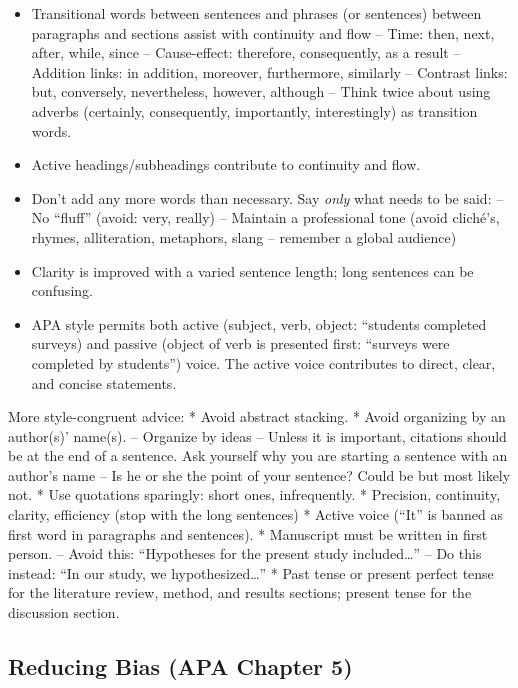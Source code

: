 \documentclass[
  english,
]{book}
\providecommand{\tightlist}{%
  \setlength{\itemsep}{0pt}\setlength{\parskip}{0pt}}
\begin{document}
\begin{itemize}
\tightlist
\item
  Transitional words between sentences and phrases (or sentences) between paragraphs and sections assist with continuity and flow
  -- Time: then, next, after, while, since
  -- Cause-effect: therefore, consequently, as a result
  -- Addition links: in addition, moreover, furthermore, similarly
  -- Contrast links: but, conversely, nevertheless, however, although
  -- Think twice about using adverbs (certainly, consequently, importantly, interestingly) as transition words.
\item
  Active headings/subheadings contribute to continuity and flow.
\item
  Don't add any more words than necessary. Say \emph{only} what needs to be said:
  -- No ``fluff'' (avoid: very, really)
  -- Maintain a professional tone (avoid cliché's, rhymes, alliteration, metaphors, slang -- remember a global audience)
\item
  Clarity is improved with a varied sentence length; long sentences can be confusing.
\item
  APA style permits both active (subject, verb, object: ``students completed surveys) and passive (object of verb is presented first: ``surveys were completed by students'') voice. The active voice contributes to direct, clear, and concise statements.
\end{itemize}

More style-congruent advice:
* Avoid abstract stacking.
* Avoid organizing by an author(s)' name(s).
-- Organize by ideas -- Unless it is important, citations should be at the end of a sentence. Ask yourself why you are starting a sentence with an author's name -- Is he or she the point of your sentence? Could be but most likely not.
* Use quotations sparingly: short ones, infrequently.
* Precision, continuity, clarity, efficiency (stop with the long sentences)
* Active voice (``It'' is banned as first word in paragraphs and sentences).
* Manuscript must be written in first person.
-- Avoid this: ``Hypotheses for the present study included\ldots{}''
-- Do this instead: ``In our study, we hypothesized\ldots{}''
* Past tense or present perfect tense for the literature review, method, and results sections; present tense for the discussion section.

\hypertarget{reducing-bias-apa-chapter-5}{%
\subsection{Reducing Bias (APA Chapter 5)}\label{reducing-bias-apa-chapter-5}}
\end{document}
